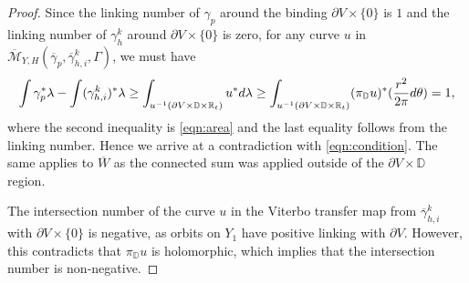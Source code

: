 \documentclass[10pt,a4paper]{amsart}
\def\D{{\mathbb D}}
\def\R{\mathbb{R}}
\def\cM{{\mathcal M}}
\def\rd{{\rm d}}
\begin{document}
\begin{proof}
     Since the linking number of $\gamma_p$ around the binding $\partial V\times\{0\}$ is $1$ and the linking number of $\gamma_h^k$ around $\partial V\times \{0\}$ is zero, for any curve $u$ in $\overline{\cM}_{Y,H}(\overline{\gamma}_p,\overline{\gamma}_{h,i}^k,\Gamma)$, we must have 
     $$\int \gamma_p^*\lambda-\int(\gamma_{h,i}^k)^*\lambda\ge \int_{u^{-1}(\partial V \times \D \times \R_t)}u^*\rd \lambda\ge \int_{u^{-1}(\partial V \times \D \times \R_t)}(\pi_{\D}u)^*(\frac{r^2}{2\pi}\rd \theta)=1,$$
     where the second inequality is \eqref{eqn:area} and the last equality follows from the linking number. Hence we arrive at a contradiction with \eqref{eqn:condition}. The same applies to $\overline{W}$ as the connected sum was applied outside of the $\partial V\times \D$ region.

    The intersection number of the curve $u$ in the Viterbo transfer map from $\overline{\gamma}_{h,i}^k$ with $\partial V \times \{0\}$ is negative, as orbits on $Y_1$ have positive linking with $\partial V$. However, this contradicts that $\pi_{\D}u$ is holomorphic, which implies that the intersection number is non-negative.  
\end{proof}
\end{document}
